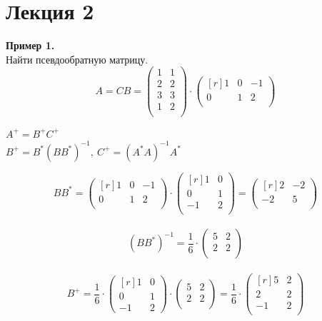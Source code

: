 \documentclass[12pt]{article}
\theoremstyle{definition}
\numberwithin{equation}{section}
\begin{document}
\section *{Лекция 2}
\noindent \textbf{Пример 1.}\\
Найти псевдообратную матрицу.\\
\[A = CB = \begin{pmatrix}
1 & 1 \\         
2 & 2 \\
3 & 3 \\
1 & 2 \\
\end{pmatrix} \cdot \begin{pmatrix}[r]
1 & 0 & -1 \\         
0 & 1 & 2 \\
\end{pmatrix}\]
\begin{center}
$A^+=B^+C^+$\\
$B^+=B^*(BB^*)^{-1}, ~C^+=(A^*A)^{-1}A^*$\\
\end{center}
\[BB^* = \begin{pmatrix}[r]
1 & 0 & -1 \\         
0 & 1 & 2 \\
\end{pmatrix} \cdot \begin{pmatrix}[r]
1 & 0 \\         
0 & 1 \\
-1 & 2 \\
\end{pmatrix} =  \begin{pmatrix}[r]
2 & -2 \\         
-2 & 5 \\
\end{pmatrix}\]\\
\[(BB^*)^{-1} = \frac{1}{6} \cdot \begin{pmatrix}
5 & 2 \\         
2 & 2 \\
\end{pmatrix}\]\\
\[B^+ = \frac{1}{6} \cdot \begin{pmatrix}[r]
1 & 0 \\         
0 & 1 \\
-1 & 2
\end{pmatrix} \cdot \begin{pmatrix}
5 & 2 \\         
2 & 2 \\
\end{pmatrix} = \frac{1}{6} \cdot \begin{pmatrix}[r]
5 & 2 \\         
2 & 2 \\
-1 & 2 \\
\end{pmatrix}\]\\
\end{document}
